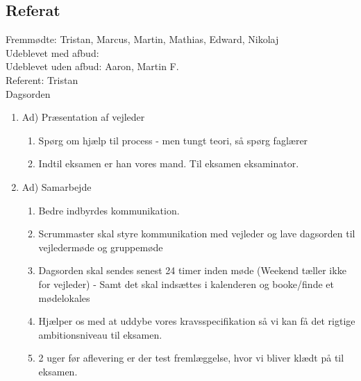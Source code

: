 \documentclass[12pt]{article}
\begin{document}
 \subsection{Referat}
 Fremmødte: Tristan, Marcus, Martin, Mathias, Edward, Nikolaj 
 \\Udeblevet med afbud:
 \\Udeblevet uden afbud: Aaron, Martin F.
 \\Referent: Tristan 
 \\Dagsorden 
 \begin{enumerate}
    \item Ad) Præsentation af vejleder
    \begin{enumerate}
        \item Spørg om hjælp til process - men tungt teori, så spørg faglærer 
        \item Indtil eksamen er han vores mand. Til eksamen eksaminator.
    \end{enumerate}
     
    \item Ad) Samarbejde
    \begin{enumerate}
        \item Bedre indbyrdes kommunikation.
        \item Scrummaster skal styre kommunikation med vejleder og lave dagsorden til vejledermøde og gruppemøde
        \item Dagsorden skal sendes senest 24 timer inden møde (Weekend tæller ikke for vejleder) - Samt det skal indsættes i kalenderen og booke/finde et mødelokales
        \item Hjælper os med at uddybe vores kravsspecifikation så vi kan få det rigtige ambitionsniveau til eksamen.
        \item 2 uger før aflevering er der test fremlæggelse, hvor vi bliver klædt på til eksamen.
    \end{enumerate} 
    

\end{enumerate}
\end{document}
